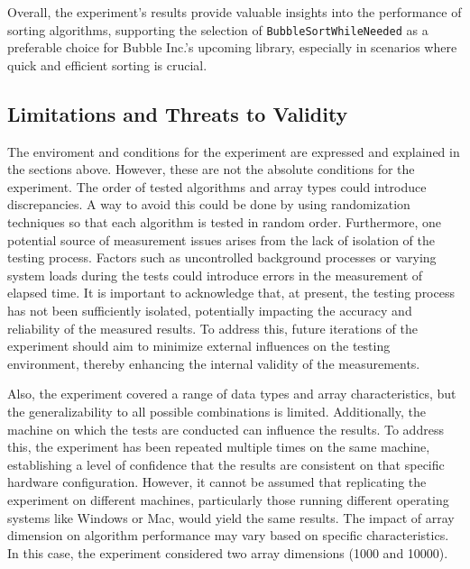 \documentclass{article}
\begin{document}
\begin{tcolorbox}[title=Conclusion, colback=white, colframe=black, arc=0pt, outer arc=0pt]
    Overall, the experiment's results provide valuable insights into the performance of sorting algorithms, supporting the selection of \texttt{BubbleSortWhileNeeded} as a preferable choice for Bubble Inc.'s upcoming library, especially in scenarios where quick and efficient sorting is crucial.
\end{tcolorbox}


\subsection{Limitations and Threats to Validity}
The enviroment and conditions for the experiment are expressed and explained in the sections above.
However, these are not the absolute conditions for the experiment.
The order of tested algorithms and array types could introduce discrepancies.
A way to avoid this could be done by using randomization techniques so that each algorithm is tested in random order.
Furthermore, one potential source of measurement issues arises from the lack of isolation of the testing process. Factors such as uncontrolled background processes or varying system loads during the tests could introduce errors in the measurement of elapsed time. It is important to acknowledge that, at present, the testing process has not been sufficiently isolated, potentially impacting the accuracy and reliability of the measured results. To address this, future iterations of the experiment should aim to minimize external influences on the testing environment, thereby enhancing the internal validity of the measurements.

Also, the experiment covered a range of data types and array characteristics, but the generalizability to all possible combinations is limited.
Additionally, the machine on which the tests are conducted can influence the results. To address this, the experiment has been repeated multiple times on the same machine, establishing a level of confidence that the results are consistent on that specific hardware configuration. However, it cannot be assumed that replicating the experiment on different machines, particularly those running different operating systems like Windows or Mac, would yield the same results.
The impact of array dimension on algorithm performance may vary based on specific characteristics. In this case, the experiment considered two array dimensions (1000 and 10000).
\end{document}
